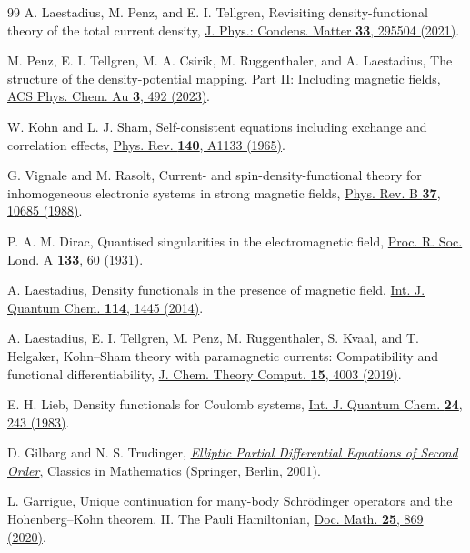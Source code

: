\documentclass[11pt,a4paper]{article}
\theoremstyle{remark}
\theoremstyle{plain}
\begin{document}
\begin{thebibliography}{99}
A. Laestadius, M. Penz, and E. I. Tellgren,
Revisiting density-functional theory of the total current density,
\href{https://doi.org/10.1088/1361-648X/abf784}
{J. Phys.: Condens. Matter \textbf{33}, 295504 (2021)}.

M. Penz, E. I. Tellgren, M. A. Csirik, M. Ruggenthaler, and
A. Laestadius,
The structure of the density-potential mapping. Part II: Including
magnetic fields,
\href{https://doi.org/10.1021/acsphyschemau.3c00006}
{ACS Phys. Chem. Au \textbf{3}, 492 (2023)}.

W. Kohn and L. J. Sham,
Self-consistent equations including exchange and correlation effects,
\href{https://doi.org/10.1103/PhysRev.140.A1133}
{Phys. Rev. \textbf{140}, A1133 (1965)}.

G. Vignale and M. Rasolt,
Current- and spin-density-functional theory for inhomogeneous
electronic systems in strong magnetic fields,
\href{https://doi.org/10.1103/PhysRevB.37.10685}
{Phys. Rev. B \textbf{37}, 10685 (1988)}.

P. A. M. Dirac,
Quantised singularities in the electromagnetic field,
\href{https://doi.org/10.1098/rspa.1931.0130}
{Proc. R. Soc. Lond. A \textbf{133}, 60 (1931)}.

A. Laestadius,
Density functionals in the presence of magnetic field,
\href{https://doi.org/10.1002/qua.24707}
{Int. J. Quantum Chem. \textbf{114}, 1445 (2014)}.

A. Laestadius, E. I. Tellgren, M. Penz, M. Ruggenthaler,
S. Kvaal, and T. Helgaker,
Kohn--Sham theory with paramagnetic currents: Compatibility and
functional differentiability,
\href{https://doi.org/10.1021/acs.jctc.9b00141}
{J. Chem. Theory Comput. \textbf{15}, 4003 (2019)}.

E. H. Lieb,
Density functionals for Coulomb systems,
\href{https://doi.org/10.1002/qua.560240302}
{Int. J. Quantum Chem. \textbf{24}, 243 (1983)}.

D. Gilbarg and N. S. Trudinger,
\href{https://doi.org/10.1007/978-3-642-61798-0}
{\emph{Elliptic Partial Differential Equations of Second Order}},
Classics in Mathematics (Springer, Berlin, 2001).

L. Garrigue,
Unique continuation for many-body Schr\"odinger operators and the
Hohenberg--Kohn theorem. II. The Pauli Hamiltonian,
\href{https://doi.org/10.4171/DM/765}
{Doc. Math. \textbf{25}, 869 (2020)}.


\end{thebibliography}
\end{document}
